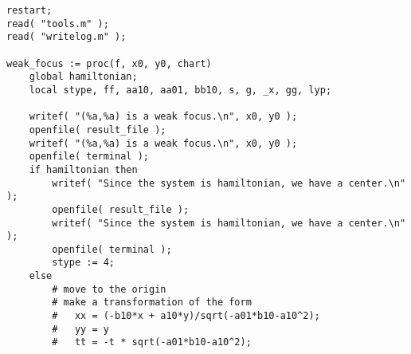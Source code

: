 \documentclass[a4paper,10pt]{article}
\begin{document}
\begin{lstlisting}[name=weakfocus]
restart;
read( "tools.m" );
read( "writelog.m" );

weak_focus := proc(f, x0, y0, chart)
    global hamiltonian;
    local stype, ff, aa10, aa01, bb10, s, g, _x, gg, lyp;

    writef( "(%a,%a) is a weak focus.\n", x0, y0 );
    openfile( result_file );
    writef( "(%a,%a) is a weak focus.\n", x0, y0 );
    openfile( terminal );
    if hamiltonian then
        writef( "Since the system is hamiltonian, we have a center.\n" );
        openfile( result_file );
        writef( "Since the system is hamiltonian, we have a center.\n" );
        openfile( terminal );
        stype := 4;
    else
        # move to the origin
        # make a transformation of the form
        #   xx = (-b10*x + a10*y)/sqrt(-a01*b10-a10^2);
        #   yy = y
        #   tt = -t * sqrt(-a01*b10-a10^2);


\end{lstlisting}
\end{document}
